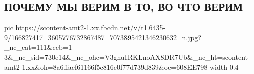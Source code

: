  
 
 
 
 

\subsection{ПОЧЕМУ МЫ ВЕРИМ В ТО, ВО ЧТО ВЕРИМ}

\ifcmt
  pic https://scontent-amt2-1.xx.fbcdn.net/v/t1.6435-9/166827417_3605776732867487_7073895421346230632_n.jpg?_nc_cat=111&ccb=1-3&_nc_sid=730e14&_nc_ohc=V3gnuIRKLnoAX8DR7Ub&_nc_ht=scontent-amt2-1.xx&oh=8a6ffacf61166f5c816e0f77d739d839&oe=608EE798
  width 0.4
\fi

